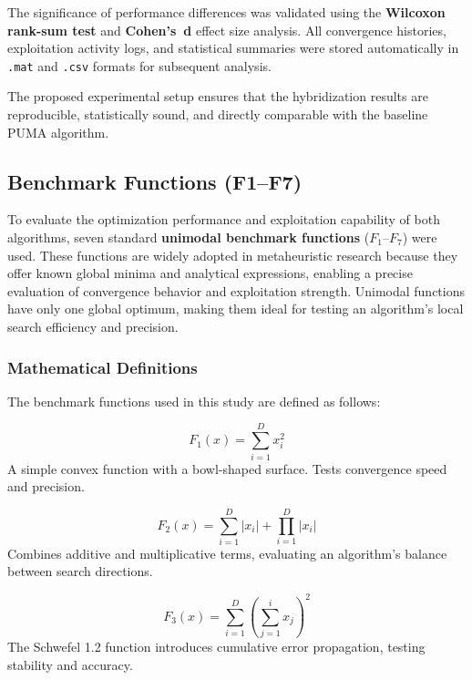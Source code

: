 \documentclass[a4paper,12pt]{article}
\begin{document}
The significance of performance differences was validated using the \textbf{Wilcoxon rank-sum test} and \textbf{Cohen’s~d} effect size analysis. 
All convergence histories, exploitation activity logs, and statistical summaries were stored automatically in \texttt{.mat} and \texttt{.csv} formats for subsequent analysis.

\bigskip
The proposed experimental setup ensures that the hybridization results are reproducible, statistically sound, and directly comparable with the baseline PUMA algorithm.

\subsection{Benchmark Functions (F1--F7)}

To evaluate the optimization performance and exploitation capability of both algorithms, seven standard \textbf{unimodal benchmark functions} ($F_1$--$F_7$) were used.  
These functions are widely adopted in metaheuristic research because they offer known global minima and analytical expressions, enabling a precise evaluation of convergence behavior and exploitation strength.  
Unimodal functions have only one global optimum, making them ideal for testing an algorithm’s local search efficiency and precision.

\subsubsection{Mathematical Definitions}

The benchmark functions used in this study are defined as follows:

\begin{equation}
F_1(x) = \sum_{i=1}^{D} x_i^2
\end{equation}
A simple convex function with a bowl-shaped surface. Tests convergence speed and precision.

\begin{equation}
F_2(x) = \sum_{i=1}^{D} |x_i| + \prod_{i=1}^{D} |x_i|
\end{equation}
Combines additive and multiplicative terms, evaluating an algorithm's balance between search directions.

\begin{equation}
F_3(x) = \sum_{i=1}^{D} \left( \sum_{j=1}^{i} x_j \right)^2
\end{equation}
The Schwefel 1.2 function introduces cumulative error propagation, testing stability and accuracy.
\end{document}
